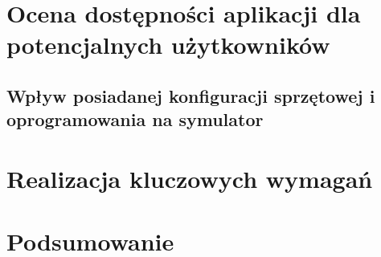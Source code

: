 \section{Ocena dostępności aplikacji dla potencjalnych użytkowników}

\subsection{Wpływ posiadanej konfiguracji sprzętowej i oprogramowania na
symulator}

\section{Realizacja kluczowych wymagań}

\section{Podsumowanie}
